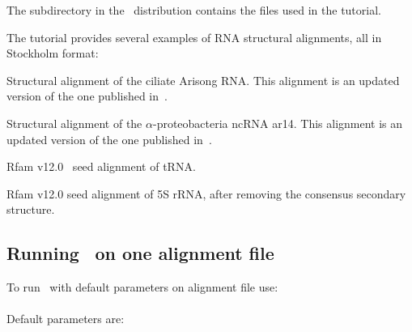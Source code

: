 The subdirectory  in the \rscape\ distribution contains the
files used in the tutorial. 

The tutorial provides several examples of RNA structural
alignments, all in Stockholm format:

\begin{sreitems}{}
\item[\emprog{updated\_Arisong.sto}] Structural alignment of the ciliate
  Arisong RNA. This alignment is an updated
  version of the one published in~\citep{JungEddy11}.
\item[\emprog{ar14.sto}] Structural alignment of the $\alpha$-proteobacteria ncRNA ar14. This alignment is an updated version of the one
  published in~\citep{delVal12}.
\item[\emprog{RF00005.sto}] Rfam v12.0~\citep{Nawrocki15} seed alignment of tRNA. 
\item[\emprog{RF00001-noss.sto}] Rfam v12.0 seed alignment of 5S rRNA, after removing the consensus secondary structure. 
\end{sreitems}


\subsection{Running \rscape\, on one alignment file}
To run \rscape\ with default parameters on alignment file
 use:\\

\\

\noindent
Default parameters are:

